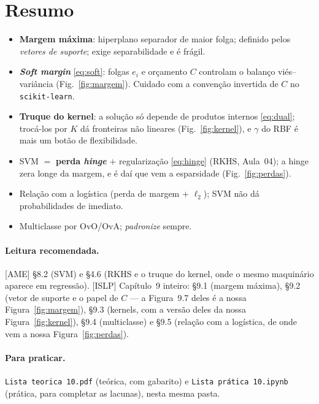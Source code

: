 \documentclass[11pt,a4paper]{article}
\begin{document}
\section*{Resumo}
\begin{itemize}[leftmargin=1.4cm]
  \item \textbf{Margem máxima}: hiperplano separador de maior folga; definido pelos
        \emph{vetores de suporte}; exige separabilidade e é frágil.
  \item \textbf{\emph{Soft margin}} \eqref{eq:soft}: folgas $e_i$ e orçamento $C$
        controlam o balanço viés--variância (Fig.~\ref{fig:margem}). Cuidado com a
        convenção invertida de $C$ no \texttt{scikit-learn}.
  \item \textbf{Truque do kernel}: a solução só depende de produtos internos
        \eqref{eq:dual}; trocá-los por $K$ dá fronteiras não lineares
        (Fig.~\ref{fig:kernel}), e $\gamma$ do RBF é mais um botão de flexibilidade.
  \item SVM $=$ \textbf{perda \emph{hinge}} $+$ regularização \eqref{eq:hinge}
        (RKHS, Aula~04); a hinge zera longe da margem, e é daí que vem a esparsidade
        (Fig.~\ref{fig:perdas}).
  \item Relação com a logística (perda de margem $+$ $\ell_2$); SVM não dá
        probabilidades de imediato.
  \item Multiclasse por OvO/OvA; \emph{padronize} sempre.
\end{itemize}

\paragraph{Leitura recomendada.} [AME] §8.2 (SVM) e §4.6 (RKHS e o truque do
kernel, onde o mesmo maquinário aparece em regressão). [ISLP] Capítulo~9 inteiro:
§9.1 (margem máxima), §9.2 (vetor de suporte e o papel de $C$ --- a Figura~9.7 deles
é a nossa Figura~\ref{fig:margem}), §9.3 (kernels, com a versão deles da nossa
Figura~\ref{fig:kernel}), §9.4 (multiclasse) e §9.5 (relação com a logística, de
onde vem a nossa Figura~\ref{fig:perdas}).

\paragraph{Para praticar.} \texttt{Lista teorica 10.pdf} (teórica, com gabarito) e \texttt{Lista prática 10.ipynb} (prática, para completar as lacunas), nesta mesma pasta.
\end{document}

